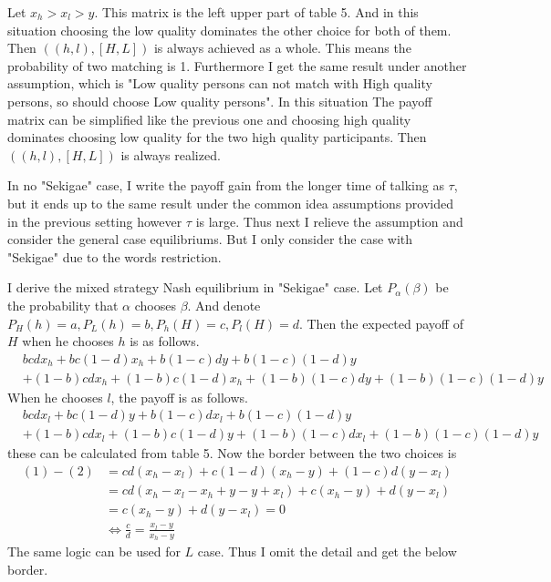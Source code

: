 \documentclass{article}
\begin{document}
	\par
	Let $x_h > x_l > y$.
	This matrix is the left upper part of table 5. And in this situation choosing the low quality dominates the other choice for both of them. Then $((h, l), [H, L])$ is always achieved as a whole. This means the probability of two matching is 1. Furthermore I get the same result under another assumption, which is "Low quality persons can not match with High quality persons, so should choose Low quality persons". In this situation The payoff matrix can be simplified like the previous one and choosing high quality dominates choosing low quality for the two high quality participants. Then $((h, l), [H, L])$ is always realized.
	\par
	In no "Sekigae" case, I write the payoff gain from the longer time of talking as $\tau$, but it ends up to the same result under the common idea assumptions provided in the previous setting however $\tau$ is large. Thus next I relieve the assumption and consider the general case equilibriums. But I only consider the case with "Sekigae" due to the words restriction.
	\par
	I derive the mixed strategy Nash equilibrium in "Sekigae" case. Let $P_\alpha(\beta)$ be the probability that $\alpha$ chooses $\beta$. And denote $P_H(h) = a, P_L(h) = b, P_h(H) = c, P_l(H) = d$. Then the expected payoff of $H$ when he chooses $h$ is as follows. 
	\begin{align}
	&bcdx_h + bc(1-d)x_h + b(1-c)dy + b(1-c)(1-d)y \nonumber \\&+ (1-b)cdx_h + (1-b)c(1-d)x_h + (1-b)(1-c)dy + (1-b)(1-c)(1-d)y
	\end{align}
	When he chooses $l$, the payoff is as follows.
	\begin{align}
	&bcdx_l + bc(1-d)y + b(1-c)dx_l + b(1-c)(1-d)y \nonumber \\&+ (1-b)cdx_l + (1-b)c(1-d)y + (1-b)(1-c)dx_l + (1-b)(1-c)(1-d)y
	\end{align}
	these can be calculated from table 5. Now the border between the two choices is 
	\begin{align}
	(1) - (2) &=  cd(x_h - x_l) + c(1-d)(x_h - y) + (1-c)d(y - x_l) \nonumber \\
	&= cd(x_h - x_l - x_h + y -y + x_l) + c(x_h - y) + d(y - x_l) \nonumber\\
	&= c(x_h - y) + d(y - x_l) = 0 \nonumber\\
	&\Leftrightarrow \frac{c}{d} = \frac{x_l - y}{x_h - y}
	\end{align}
	The same logic can be used for $L$ case. Thus I omit the detail and get the below border.
\end{document}

